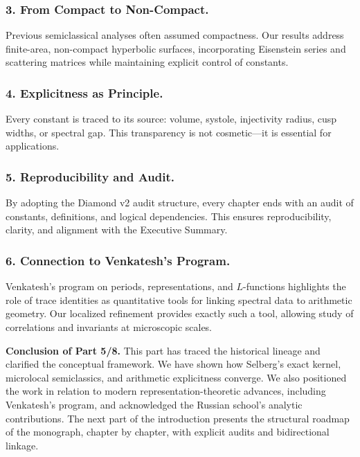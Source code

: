 \subsubsection*{3. From Compact to Non-Compact.}
Previous semiclassical analyses often assumed compactness.
Our results address finite-area, non-compact hyperbolic surfaces,
incorporating Eisenstein series and scattering matrices
while maintaining explicit control of constants.

\subsubsection*{4. Explicitness as Principle.}
Every constant is traced to its source: volume, systole, injectivity radius,
cusp widths, or spectral gap.
This transparency is not cosmetic—it is essential for applications.

\subsubsection*{5. Reproducibility and Audit.}
By adopting the Diamond v2 audit structure,
every chapter ends with an audit of constants, definitions, and logical dependencies.
This ensures reproducibility, clarity, and alignment with the Executive Summary.

\subsubsection*{6. Connection to Venkatesh’s Program.}
Venkatesh’s program on periods, representations, and $L$-functions
\cite{VenkateshProgram} highlights the role of trace identities
as quantitative tools for linking spectral data to arithmetic geometry.
Our localized refinement provides exactly such a tool,
allowing study of correlations and invariants at microscopic scales.

\medskip

\noindent\textbf{Conclusion of Part 5/8.}
This part has traced the historical lineage and clarified the conceptual framework.
We have shown how Selberg’s exact kernel,
microlocal semiclassics, and arithmetic explicitness converge.
We also positioned the work in relation to modern representation-theoretic advances,
including Venkatesh’s program, and acknowledged the Russian school’s analytic contributions.
The next part of the introduction presents the structural roadmap of the monograph,
chapter by chapter, with explicit audits and bidirectional linkage.


